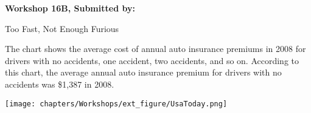 \documentclass[11pt]{book}\usepackage[]{graphicx}\usepackage[]{color}
\begin{document}
\begin{exercises}
\begin{exercise}
\end{exercise}
\begin{solution}  %

\end{solution}

\clearpage

    \begin{exercise}  %

    \begin{center}
\begin{flushleft}\textbf{\large \hfill Workshop 16B, Submitted by: }\end{flushleft}

\end{center}

\begin{minipage}[ht]{6.9cm}

Too Fast, Not Enough Furious

The chart shows the average cost of  annual auto insurance premiums in 2008 for drivers with no accidents, one  accident, two accidents, and so on.  According to this chart, the average  annual auto insurance premium for drivers with no accidents was \$1,387 in 2008.

\end{minipage} \hfill
\begin{minipage}[ht]{6.9cm}

\texttt{[image: chapters/Workshops/ext\_figure/UsaToday.png]} %

\end{minipage}


\end{exercise}
\end{exercises}
\end{document}
